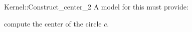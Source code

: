 \begin{ccRefFunctionObjectConcept}{Kernel::Construct_center_2}
A model for this must provide:


 {compute the center of the circle $c$.}

\end{ccRefFunctionObjectConcept}

